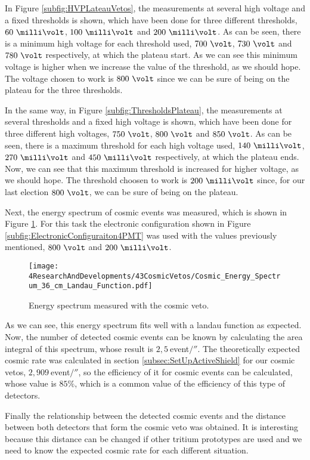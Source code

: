 In Figure \ref{subfig:HVPLateauVetos}, the measurements at several high voltage and a fixed thresholds is shown, which have been done for three different thresholds, $60~\milli\volt$, $100~\milli\volt$ and $200~\milli\volt$. As can be seen, there is a minimum high voltage for each threshold used, $700~\volt$, $730~\volt$ and $780~\volt$ respectively, at which the plateau start. As we can see this minimum voltage is higher when we increase the value of the threshold, as we should hope. The voltage chosen to work is $800~\volt$ since we can be sure of being on the plateau for the three thresholds.

In the same way, in Figure \ref{subfig:ThresholdsPlateau}, the measurements at several thresholds and a fixed high voltage is shown, which have been done for three different high voltages, $750~\volt$, $800~\volt$ and $850~\volt$. As can be seen, there is a maximum threshold for each high voltage used,  $140~\milli\volt$, $270~\milli\volt$ and $450~\milli\volt$ respectively, at which the plateau ends. Now, we can see that this maximum threshold is increased for higher voltage, as we should hope. The threshold choosen to work is $200~\milli\volt$ since, for our last election $800~\volt$, we can be sure of being on the plateau. 

Next, the energy spectrum of cosmic events was measured, which is shown in Figure \ref{fig:EnergySpectrumCosmicVeto}. For this task the electronic configuration shown in Figure \ref{subfig:ElectronicConfiguraiton4PMT} was used with the values previously mentioned, $800~\volt$ and $200~\milli\volt$. 

\begin{figure}[h]
\centering
\texttt{[image: 4ResearchAndDevelopments/43CosmicVetos/Cosmic\_Energy\_Spectrum\_36\_cm\_Landau\_Function.pdf]}
\caption{Energy spectrum measured with the cosmic veto.\label{fig:EnergySpectrumCosmicVeto}}
\end{figure}

As we can see, this energy spectrum fits well with a landau function as expected. Now, the number of detected cosmic events can be known by calculating the area integral of this spectrum, whose result is $2,5~$event$/\second$. The theoretically expected cosmic rate was calculated in section \ref{subsec:SetUpActiveShield} for our cosmic vetos, $2,909~$event$/\second$, so the efficiency of it for cosmic events can be calculated, whose value is $85\%$, which is a common value of the efficiency of this type of detectors.

Finally the relationship between the detected cosmic events and the distance between both detectors that form the cosmic veto was obtained. It is interesting because this distance can be changed if other tritium prototypes are used and we need to know the expected cosmic rate for each different situation.

